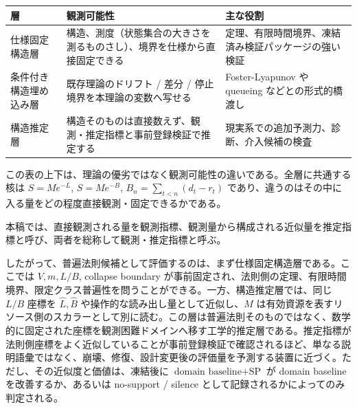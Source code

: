 \documentclass[12pt,a4paper]{article}
\begin{document}
{\def\LTcaptype{table} %
\begin{longtable}[]{@{}
  >{\raggedright\arraybackslash}p{}
  >{\raggedright\arraybackslash}p{}
  >{\raggedright\arraybackslash}p{}@{}}
\toprule\noalign{}
\begin{minipage}[b]{\linewidth}\raggedright
層
\end{minipage} & \begin{minipage}[b]{\linewidth}\raggedright
観測可能性
\end{minipage} & \begin{minipage}[b]{\linewidth}\raggedright
主な役割
\end{minipage} \\
\midrule\noalign{}
\endhead
\bottomrule\noalign{}
\endlastfoot
仕様固定構造層 & 構造、測度（状態集合の大きさを測るものさし）、境界を仕様から直接固定できる & 定理、有限時間境界、凍結済み検証パッケージの強い検証 \\
条件付き構造埋め込み層 & 既存理論のドリフト / 差分 / 停止境界を本理論の変数へ写せる & Foster-Lyapunov や queueing などとの形式的橋渡し \\
構造推定層 & 構造そのものは直接数えず、観測・推定指標と事前登録検証で推定する & 現実系での追加予測力、診断、介入候補の検査 \\
\end{longtable}
}

この表の上下は、理論の優劣ではなく観測可能性の違いである。全層に共通する核は \(S=Me^{-L}\), \(S=Me^{-B}\), \(B_{n}=\sum_{t<n}(d_{t}-r_{t})\) であり、違うのはその中に入る量をどの程度直接観測・固定できるかである。

本稿では、直接観測される量を観測指標、観測量から構成される近似量を推定指標と呼び、両者を総称して観測・推定指標と呼ぶ。

したがって、普遍法則候補として評価するのは、まず仕様固定構造層である。ここでは \(V,m,L/B\), collapse boundary が事前固定され、法則側の定理、有限時間境界、限定クラス普遍性を問うことができる。一方、構造推定層では、同じ \(L/B\) 座標を \(\hat L,\hat B\) や操作的な読み出し量として近似し、\(M\) は有効資源を表すリソース側のスカラーとして別に読む。この層は普遍法則そのものではなく、数学的に固定された座標を観測困難ドメインへ移す工学的推定層である。推定指標が法則側座標をよく近似していることが事前登録検証で確認されるほど、単なる説明語彙ではなく、崩壊、修復、設計変更後の評価量を予測する装置に近づく。ただし、その近似度と価値は、凍結後に \(\text{domain baseline}+\text{SP}\) が domain baseline を改善するか、あるいは no-support / silence として記録されるかによってのみ判定される。
\end{document}

